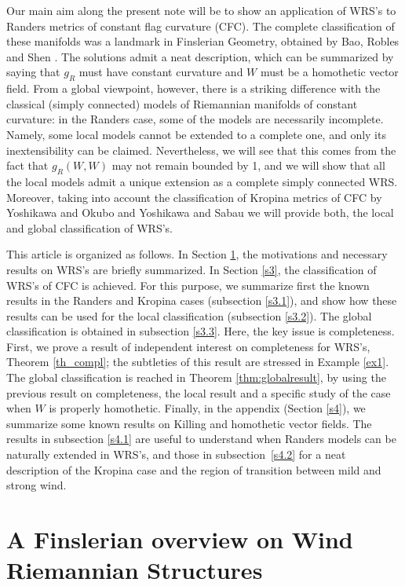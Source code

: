 \documentclass[reqno,10pt]{amsart}
\begin{document}
 Our main aim along the present note will be to show an application of WRS's to 
 Randers metrics of constant flag curvature (CFC).  The complete classification of these manifolds was a landmark in Finslerian Geometry, obtained by  Bao, Robles and Shen \cite{BRS}. The solutions admit a neat description, which can be summarized by saying that $g_R$ must have constant curvature and $W$ must be  a  homothetic vector field.
 From a global viewpoint, however, there is  a  striking difference with the classical (simply connected) models of Riemannian manifolds of constant curvature:  in the Randers case, some of the  models  are necessarily incomplete.  Namely,  some local models cannot be extended to a complete one,  and only its  inextensibility can be claimed. Nevertheless, we will see that this comes from the fact that $g_R(W,W)$ may not remain bounded by 1, and we will show that all the local models admit a unique extension as a complete simply connected WRS. Moreover, taking into account the classification of Kropina metrics of CFC by   Yoshikawa and Okubo \cite{YoOk07} and Yoshikawa and Sabau \cite{YoSa} we will provide both, the local and global classification of WRS's.
 
 This article is organized as follows. In Section \ref{s2},  the motivations and necessary results on WRS's are briefly summarized.  
In Section \ref{s3}, the classification of WRS's  of CFC is achieved. For this purpose, we summarize first the known results in the Randers \cite{BRS} and Kropina cases \cite{YoOk07, YoSa} (subsection \ref{s3.1}), and  show how these results can be used for the local classification  (subsection \ref{s3.2}). The global classification is obtained in subsection \ref{s3.3}. Here, the key issue is completeness. First, we  prove a result of independent interest on completeness for WRS's,  Theorem \ref{th_compl}; the subtleties of this result are stressed in Example \ref{ex1}.  The global classification is reached in Theorem \ref{thm:globalresult}, by using the previous  result on completeness, the local result and a specific study of the case when $W$ is properly homothetic. 
Finally, in  the appendix (Section \ref{s4}), we summarize some known results on Killing and homothetic vector  fields.  The results in subsection \ref{s4.1}  are useful to understand when Randers models can be naturally extended in  WRS's, and those in subsection~\ref{s4.2} for a neat description of the Kropina case and the region of  transition between mild and strong wind.

\section{A Finslerian overview on Wind Riemannian Structures}\label{s2}
\end{document}
